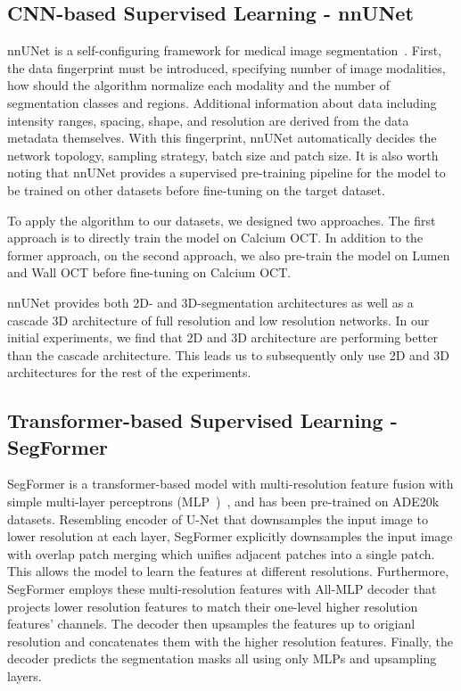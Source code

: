 \documentclass[a4paper,11pt,oneside]{report}
\begin{document}
\subsection{CNN-based Supervised Learning - nnUNet}\label{sec:design:nnunet}
nnUNet is a self-configuring framework for medical image segmentation~\cite{Isensee2020}. First, the data fingerprint must be introduced, specifying number of image modalities, how should the algorithm normalize each modality and the number of segmentation classes and regions. Additional information about data including intensity ranges, spacing, shape, and resolution are derived from the data metadata themselves. With this fingerprint, nnUNet automatically decides the network topology, sampling strategy, batch size and patch size. It is also worth noting that nnUNet provides a supervised pre-training pipeline for the model to be trained on other datasets before fine-tuning on the target dataset.

To apply the algorithm to our datasets, we designed two approaches. The first approach is to directly train the model on Calcium OCT. In addition to the former approach, on the second approach, we also pre-train the model on Lumen and Wall OCT before fine-tuning on Calcium OCT. 

nnUNet provides both 2D- and 3D-segmentation architectures as well as a cascade 3D architecture of full resolution and low resolution networks. In our initial experiments, we find that 2D and 3D architecture are performing better than the cascade architecture. This leads us to subsequently only use 2D and 3D architectures for the rest of the experiments.


\subsection{Transformer-based Supervised Learning - SegFormer}
SegFormer is a transformer-based model with multi-resolution feature fusion with simple multi-layer perceptrons (MLP~\cite{Rumelhart1986})~\cite{Xie2021SegFormer}, and has been pre-trained on ADE20k~\cite{Zhou2018} datasets. Resembling encoder of U-Net that downsamples the input image to lower resolution at each layer, SegFormer explicitly downsamples the input image with overlap patch merging which unifies adjacent patches into a single patch. This allows the model to learn the features at different resolutions. Furthermore, SegFormer employs these multi-resolution features with All-MLP decoder that projects lower resolution features to match their one-level higher resolution features' channels. The decoder then upsamples the features up to origianl resolution and concatenates them with the higher resolution features. Finally, the decoder predicts the segmentation masks all using only MLPs and upsampling layers. 
\end{document}
